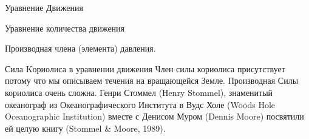 \begin{chapter}{Уравнение Движения}
\begin{section}{Уравнение количества движения}
\begin{paragraph}{Производная члена (элемента) давления.}
\end{paragraph}

\begin{paragraph}{Сила Kориолиса в уравнении движения}
Член силы кориолиса присутствует потому что мы описываем течения на
вращающейся Земле. Производная Силы кориолиса очень сложна. Генри
Стоммел (Henry Stommel), знаменитый океанограф из Океанографического
Института в Вудс Холе (Woods Hole Oceanographic Institution) вместе с
Денисом Муром (Dennis Moore) посвятили ей целую книгу (Stommel \& Moore, 1989).
%


\end{paragraph}
\end{section}
\end{chapter}
